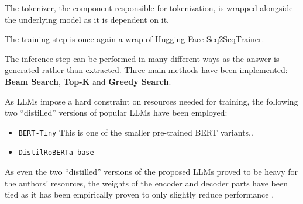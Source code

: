 \documentclass[11pt]{article}
\begin{document}
The tokenizer, the component responsible for tokenization, is wrapped alongside the underlying model as it is dependent on it.

The training step is once again a wrap of Hugging Face Seq2SeqTrainer.

The inference step can be performed in many different ways as the answer is generated rather than extracted. Three main methods have been implemented: \textbf{Beam Search}, \textbf{Top-K} and \textbf{Greedy Search}.

As LLMs impose a hard constraint on resources needed for training, the following two ``distilled'' versions of popular LLMs have been employed:

\begin{itemize}
\item \texttt{BERT-Tiny} \cite{Bhargava2021, Turc2019}
This is one of the smaller pre-trained BERT variants..
\item \texttt{DistilRoBERTa-base} \cite{Sanh2019}
\end{itemize}

As even the two ``distilled'' versions of the proposed LLMs proved to be heavy for the authors' resources, the weights of the encoder and decoder parts have been tied as it has been empirically proven to only slightly reduce performance \cite{Rothe2020}.


\end{document}
